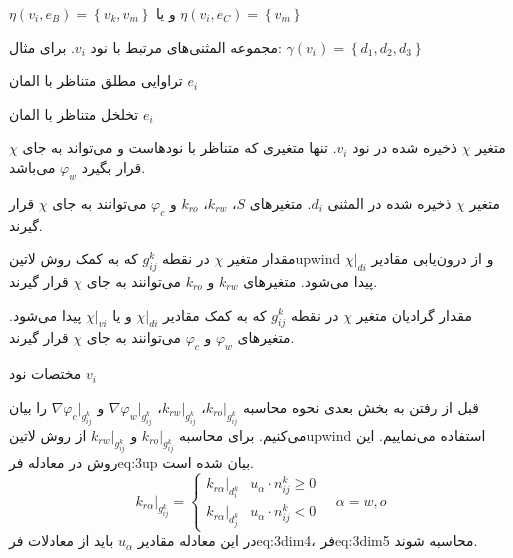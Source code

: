 \begin{tight_itemize}
$\eta(v_i,e_B) = \left\{ v_k, v_m \right\}$ و یا $\eta(v_i,e_C) = \left\{  v_m \right\}$ 
\item[$\gamma(v_i)$]
 مجموعه المثنی‌های مرتبط با نود $v_i$. برای مثال:
$\gamma(v_i) = \left\{ d_1, d_2, d_3 \right\}$ 
\item[$\textbf{K}^i$]
تراوایی مطلق متناظر با المان $e_i$ 
\item[$\phi^i$]
تخلخل متناظر با المان $e_i$ 
\item[$\chi|_{vi}$]
 متغیر $\chi$ ذخیره شده در نود $v_i$. تنها متغیری که متناظر با نودهاست و می‌تواند به جای $\chi$ قرار بگیرد $\varphi_w$ می‌باشد. 
\item[$\chi|_{di}$]
 متغیر $\chi$ ذخیره شده در المثنی $d_i$. متغیرهای
$S$، $k_{rw}$، $k_{ro}$ و $\varphi_c$
می‌توانند به جای $\chi$ قرار گیرند. 
\item[$\chi|_{g_{ij}^k}$]
مقدار متغیر $\chi$ در نقطه $g_{ij}^k$ که به کمک روش ‌لاتین{upwind} و از درون‌یابی مقادیر $\chi|_{di}$ پیدا می‌شود. متغیرهای
$k_{rw}$ و $k_{ro}$
می‌توانند به جای $\chi$ قرار گیرند. 
\item[$\nabla\chi|_{g_{ij}^k}$]
مقدار گرادیان متغیر $\chi$ در نقطه $g_{ij}^k$ که به کمک مقادیر $\chi|_{di}$ و یا $\chi|_{vi}$ پیدا می‌شود. متغیرهای
$\varphi_w$ و $\varphi_c$
می‌توانند به جای $\chi$ قرار گیرند. 
\item[$\vec{X}_{v_i}$]
مختصات نود $v_i$
\end{tight_itemize}

قبل از رفتن به بخش بعدی نحوه محاسبه
 $k_{ro}|_{g_{ij}^k}$، $k_{rw}|_{g_{ij}^k}$،  $\nabla\varphi_w|_{g_{ij}^k}$ و $\nabla\varphi_c|_{g_{ij}^k}$ 
را بیان می‌کنیم. برای محاسبه $k_{ro}|_{g_{ij}^k}$ و $k_{rw}|_{g_{ij}^k}$ از روش ‌لاتین{upwind} استفاده می‌نماییم. این روش در معادله ‌فر{eq:3up} بیان شده است.
\begin{equation}
\label{eq:3up}
k_{r\alpha}|_{g_{ij}^k} = 
\begin{cases}
k_{r\alpha}|_{d_i^k}	&u_\alpha \cdot n_{ij}^k \geq 0 \\
k_{r\alpha}|_{d_j^k}	&u_\alpha \cdot n_{ij}^k < 0
\end{cases}
\quad \alpha = w,o
\end{equation}
در این معادله مقادیر $u_\alpha$ باید از معادلات ‌فر{eq:3dim4}، ‌فر{eq:3dim5} محاسبه شوند.

